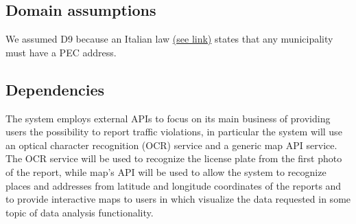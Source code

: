 \subsection{Domain assumptions}

\begin{enumerate}[label={D\arabic*.}]
	 \label{D_email}
     \label{D_reports}
     \label{D_mun_availability}
   	 \label{D_mun_accuracy}
     \label{D_auth_validation}
     \label{D_gps}
     \label{D_internet}
     \label{D_city_auth}
     \label{D_pce}
     \label{D_pce_api}
     \label{D_unique_license_plate}
   	 \label{D_photo}
   	 \label{D_OCR}
   	 \label{D_maps}
\end{enumerate}
We assumed D9 because an Italian law \hyperlink{CircolarePEC}{(see link)} states that any municipality must have a PEC address.

\subsection{Dependencies}

The system employs external APIs to focus on its main business of providing users the possibility to report traffic violations, in particular the system will use an optical character recognition (OCR) service and a generic map API service. The OCR service will be used to recognize the license plate from the first photo of the report, while map's API will be used to allow the system to recognize places and addresses from latitude and longitude coordinates of the reports and to provide interactive maps to users in which visualize the data requested in some topic of data analysis functionality.
